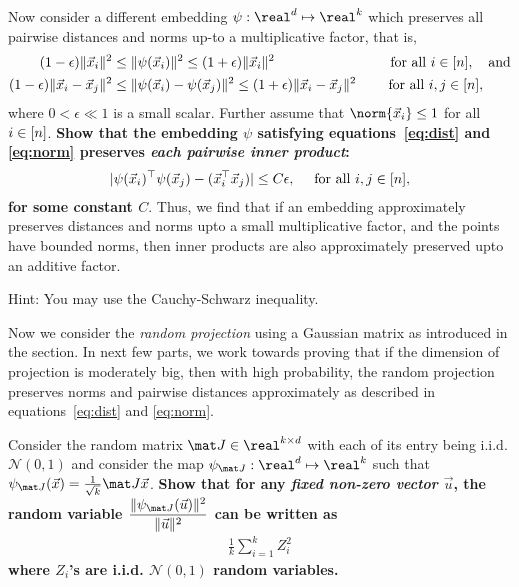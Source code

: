 \documentclass[preview]{standalone}
\begin{document}
\begin{Parts}
\Part Now consider a different embedding $\psi:\real^\dims \mapsto \real^k$ 
which preserves all pairwise distances and norms up-to a multiplicative factor, 
that is,
\begin{align}
	(1-\epsilon) \Vert \vec x_i \Vert^2 &\leq \Vert \psi(\vec x_i) \Vert^2 \leq (1+\epsilon) \Vert \vec x_i \Vert^2 \quad &\text{ for all } i \in [n], \quad\text{and} \label{eq:norm}\\
	(1-\epsilon) \Vert\vec x_i - \vec x_j \Vert^2 &\leq  \Vert \psi(\vec x_i) - \psi(\vec x_j) \Vert^2 
	\leq (1+\epsilon) \Vert\vec x_i - \vec x_j \Vert^2 \quad &\text{ for all } i, j \in [n], \quad \quad \label{eq:dist}
\end{align}
where $0<\epsilon \ll 1$ is a small scalar.
Further assume that $\norm{\vec{x}_i} \leq 1$ for all $i \in [n]$.
{\bf Show that the embedding $\psi$ satisfying equations~\eqref{eq:dist} and \eqref{eq:norm} 
preserves \emph{each pairwise inner product}:}
\begin{align}
\label{eq:psi_iprod}
	\vert \psi(\vec x_i)^\top\psi(\vec x_j) - (\vec x_i^\top \vec x_j) \vert  \leq C\epsilon, \quad \text{ for all } i, j \in [n],
\end{align}
{\bf for some constant $C$}.
Thus, we find that if an embedding  approximately preserves distances and norms upto a small multiplicative factor, 
and the points have bounded norms, then 
inner products are also approximately preserved upto an additive factor.


Hint: You may use the Cauchy-Schwarz inequality.




\Part Now we consider the \emph{random projection} using a Gaussian matrix as introduced in the section.
In next few parts, we work towards proving that if the dimension of projection
is moderately big, then with high probability, the random projection preserves norms and pairwise 
distances approximately as described in equations~\eqref{eq:dist} and \eqref{eq:norm}.

Consider the random matrix $ \mat J \in \real^{k \times d}$ with each of its entry being i.i.d. $\mathcal{N}(0, 1)$
and consider the map $\psi_{\mat J}: \real^\dims \mapsto \real^k$ such that $\psi_{\mat J}(\vec{x})= \frac{1}{\sqrt{k}}\mat J \vec x$.
{\bf Show that for any \emph{fixed non-zero vector $\vec u$}, 
the random variable $\displaystyle\frac{\Vert \psi_{\mat J}(\vec u)\Vert^2}{\Vert \vec u\Vert^2}$ 
can be written as 
\begin{align*}
	\frac{1}{k}\sum_{i=1}^k Z_i^2
\end{align*}
where $Z_i$'s are i.i.d. $\mathcal{N}(0, 1)$ random variables.}




\end{Parts}
\end{document}
